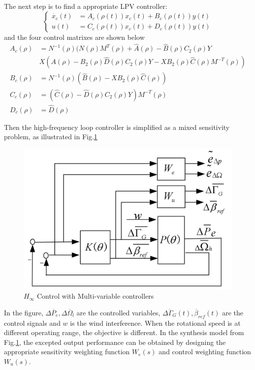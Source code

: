 \documentclass[english]{cccconf}
\begin{document}
The next step is to find a appropriate LPV controller:
\begin{equation}\label{e:12}
  \begin{cases}
    \dot{x_c}(t) & = A_c(\rho(t))x_c(t) + B_c(\rho(t))y(t) \\
    u(t) & = C_c(\rho(t))x_c(t) + D_c(\rho(t))y(t)
  \end{cases}
\end{equation}
and the four control matrixes are shown below
\begin{equation*}
  \begin{split}
    A_c(\rho) & = N^{-1}(\rho)(N(\rho)M^T(\rho) + \hat{A}(\rho) - \hat{B}(\rho)C_2(\rho)Y \\
              & X(A(\rho) - B_2(\rho)\hat{D}(\rho)C_2(\rho)Y - XB_2(\rho)\hat{C}(\rho)M^{-T}(\rho)) \\
    B_c(\rho) & = N^{-1}(\rho)(\hat{B}(\rho) - XB_2(\rho)\hat{C}(\rho)) \\
    C_c(\rho) & = (\hat{C}(\rho) - \hat{D}(\rho)C_2(\rho)Y)M^{-T}(\rho) \\
    D_c(\rho) & = \hat{D}(\rho)
  \end{split}
\end{equation*}

Then the high-frequency loop controller is simplified as a mixed sensitivity
problem, as illustrated in Fig.\ref{fig1}
\begin{figure}[!htb]
  \centering
  \includegraphics[width=\hsize]{1.png}
  \caption{$H_\infty$ Control with Multi-variable controllers}
  \label{fig1}
\end{figure}

In the figure, $\Delta\overline{P}_e, \Delta\overline{\Omega}_l$ are the
controlled variables, $\overline{\Delta\Gamma_G}(t), \overline\beta_{ref}(t)$
are the control signals and $w$ is the wind interference. When the rotational
speed is at different operating range, the objective is different. In the
synthesis model from Fig.\ref{fig1}, the excepted output performance can be
obtained by designing the appropriate sensitivity weighting function $W_e(s)$
and control weighting function $W_u(s)$.
\end{document}

